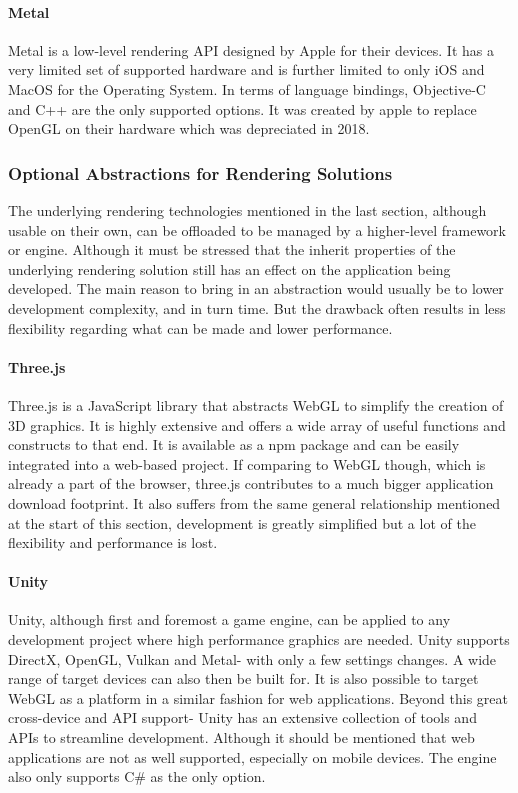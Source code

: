 \paragraph{Metal}
Metal is a low-level rendering API designed by Apple for their devices. It has a very limited set of supported hardware and is further limited to only iOS and MacOS for the Operating System. In terms of language bindings, Objective-C and C++ are the only supported options.  It was created by apple to replace OpenGL on their hardware which was depreciated in 2018.

\subsubsection{Optional Abstractions for Rendering Solutions}
The underlying rendering technologies mentioned in the last section, although usable on their own, can be offloaded to be managed by a higher-level framework or engine. Although it must be stressed that the inherit properties of the underlying rendering solution still has an effect on the application being developed.
The main reason to bring in an abstraction would usually be to lower development complexity, and in turn time. But the drawback often results in less flexibility regarding what can be made and lower performance.

\paragraph{Three.js}
Three.js is a JavaScript library that abstracts WebGL to simplify the creation of 3D graphics. It is highly extensive and offers a wide array of useful functions and constructs to that end. It is available as a npm package and can be easily integrated into a web-based project. If comparing to WebGL though, which is already a part of the browser, three.js contributes to a much bigger application download footprint. It also suffers from the same general relationship mentioned at the start of this section, development is greatly simplified but a lot of the flexibility and performance is lost.

\paragraph{Unity}
Unity, although first and foremost a game engine, can be applied to any development project where high performance graphics are needed. Unity supports DirectX, OpenGL, Vulkan and Metal- with only a few settings changes. A wide range of target devices can also then be built for. It is also possible to target WebGL as a platform in a similar fashion for web applications. Beyond this great cross-device and API support- Unity has an extensive collection of tools and APIs to streamline development. Although it should be mentioned that web applications are not as well supported, especially on mobile devices. The engine also only supports C\# as the only option.

